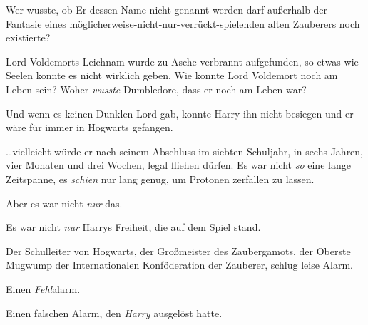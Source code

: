 Wer wusste, ob Er-dessen-Name-nicht-genannt-werden-darf außerhalb der Fantasie eines möglicherweise-nicht-nur-verrückt-spielenden alten Zauberers noch existierte?

Lord Voldemorts Leichnam wurde zu Asche verbrannt aufgefunden, so etwas wie Seelen konnte es nicht wirklich geben. Wie konnte Lord Voldemort noch am Leben sein? Woher \emph{wusste} Dumbledore, dass er noch am Leben war?

Und wenn es keinen Dunklen Lord gab, konnte Harry ihn nicht besiegen und er wäre für immer in Hogwarts gefangen.

…vielleicht würde er nach seinem Abschluss im siebten Schuljahr, in sechs Jahren, vier Monaten und drei Wochen, legal fliehen dürfen. Es war nicht \emph{so} eine lange Zeitspanne, es \emph{schien} nur lang genug, um Protonen zerfallen zu lassen.

Aber es war nicht \emph{nur} das.

Es war nicht \emph{nur} Harrys Freiheit, die auf dem Spiel stand.

Der Schulleiter von Hogwarts, der Großmeister des Zaubergamots, der Oberste Mugwump der Internationalen Konföderation der Zauberer, schlug leise Alarm.

Einen \emph{Fehl}{}alarm.

Einen falschen Alarm, den \emph{Harry} ausgelöst hatte.


